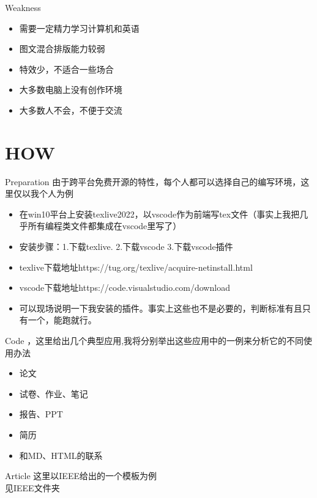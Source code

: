\documentclass[fontset = none]{beamer}
\begin{document}
\begin{frame}{Weakness}
    \begin{itemize}
        \item 需要一定精力学习计算机和英语%
        \item 图文混合排版能力较弱
        \item 特效少，不适合一些场合%
        \item 大多数电脑上没有创作环境%
        \item 大多数人不会，不便于交流
    \end{itemize}
\end{frame}
\section{HOW}
\begin{frame}{Preparation}
    由于跨平台免费开源的特性，每个人都可以选择自己的编写环境，这里仅以我个人为例
    \begin{itemize}
        \item 在win10平台上安装texlive2022，以vscode作为前端写tex文件（事实上我把几乎所有编程类文件都集成在vscode里写了）
        \item 安装步骤：1.下载texlive. 2.下载vscode 3.下载vscode插件
        \item texlive下载地址https://tug.org/texlive/acquire-netinstall.html
        \item vscode下载地址https://code.visualstudio.com/download
        \item 可以现场说明一下我安装的插件。事实上这些也不是必要的，判断标准有且只有一个，能跑就行。
    \end{itemize}
\end{frame}
\begin{frame}{Code}
    ，这里给出几个典型应用,我将分别举出这些应用中的一例来分析它的不同使用办法
    \begin{itemize}
        \item 论文
        \item 试卷、作业、笔记
        \item 报告、PPT
        \item 简历
        \item 和MD、HTML的联系
    \end{itemize}
\end{frame}
\begin{frame}{Article}
    这里以IEEE给出的一个模板为例
    \\见IEEE文件夹
\end{frame}
\end{document}
